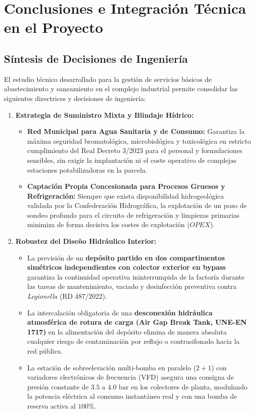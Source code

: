 \documentclass{report}
\begin{document}
\chapter{Conclusiones e Integración Técnica en el Proyecto}
\label{cap:conclusiones_integracion}

\section{Síntesis de Decisiones de Ingeniería}

El estudio técnico desarrollado para la gestión de servicios básicos de abastecimiento y saneamiento en el complejo industrial permite consolidar las siguientes directrices y decisiones de ingeniería:

\begin{enumerate}
    \item \textbf{Estrategia de Suministro Mixta y Blindaje Hídrico:}
          \begin{itemize}
              \item \textbf{Red Municipal para Agua Sanitaria y de Consumo:} Garantiza la máxima seguridad bromatológica, microbiológica y toxicológica en estricto cumplimiento del Real Decreto 3/2023 para el personal y formulaciones sensibles, sin exigir la implantación ni el coste operativo de complejas estaciones potabilizadoras en la parcela.
              \item \textbf{Captación Propia Concesionada para Procesos Gruesos y Refrigeración:} Siempre que exista disponibilidad hidrogeológica validada por la Confederación Hidrográfica, la explotación de un pozo de sondeo profundo para el circuito de refrigeración y limpiezas primarias minimiza de forma decisiva los costes de explotación ($OPEX$).
          \end{itemize}

    \item \textbf{Robustez del Diseño Hidráulico Interior:}
          \begin{itemize}
              \item La previsión de un \textbf{depósito partido en dos compartimentos simétricos independientes con colector exterior en bypass} garantiza la continuidad operativa ininterrumpida de la factoría durante las tareas de mantenimiento, vaciado y desinfección preventiva contra \textit{Legionella} (RD 487/2022).
              \item La intercalación obligatoria de una \textbf{desconexión hidráulica atmosférica de rotura de carga (Air Gap Break Tank, UNE-EN 1717)} en la alimentación del depósito elimina de manera absoluta cualquier riesgo de contaminación por reflujo o contrasifonado hacia la red pública.
              \item La estación de sobreelevación multi-bomba en paralelo ($2+1$) con variadores electrónicos de frecuencia (VFD) asegura una consigna de presión constante de $3.5\text{ a }4.0\text{ bar}$ en los colectores de planta, modulando la potencia eléctrica al consumo instantáneo real y con una bomba de reserva activa al $100\%$.
          \end{itemize}


\end{enumerate}
\end{document}

